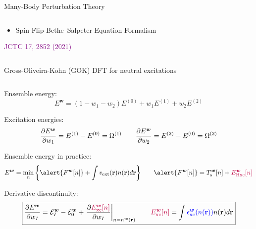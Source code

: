 \documentclass[aspectratio=169,9pt]{beamer}
\newcommand{\br}{\mathbf{r}}
\newcommand{\purple}[1]{\textcolor{purple}{#1}}
\newcommand{\blue}[1]{\textcolor{blue}{#1}}
\newcommand{\pub}[1]{{\small \textcolor{purple}{#1}}}
\begin{document}
\begin{frame}{Many-Body Perturbation Theory}
\begin{columns}
        \begin{column}{0.50\textwidth}
	\begin{itemize}
	\item Spin-Flip Bethe–Salpeter Equation Formalism
	\end{itemize}
	\pub{JCTC 17, 2852 (2021)}
        \end{column}
        \end{columns}
\end{frame}


\begin{frame}{Gross-Oliveira-Kohn (GOK) DFT for neutral excitations}
        \begin{columns}
        \begin{column}{0.80\textwidth}

        Ensemble energy:
        \begin{equation*}
                \boxed{E^{\bm{w}}= (1 - w_1 - w_2) E^{(0)} + w_1 E^{(1)} + w_2 E^{(2)}}
        \end{equation*}

        Excitation energies:
        \begin{equation*}
                \pdv{E^{\bm{w}}}{w_{1}}= E^{(1)} - E^{(0)} = \Omega^{(1)}
                \qquad \pdv{E^{\bm{w}}}{w_{2}}= E^{(2)} - E^{(0)} = \Omega^{(2)}
        \end{equation*}

        Ensemble energy in practice:
        \begin{equation*}
                E^{\bm{w}} = \min_{n} \qty{ \alert{F^{\bm{w}}[n]} + \int v_\text{ext}(\br{}) n(\br{}) d\br{} }
                \qquad
                \alert{F^{\bm{w}}[n]} = T_\text{s}^{\bm{w}}[n] + \purple{E_\text{Hxc}^{\bm{w}}[n]}
        \end{equation*}

        Derivative discontinuity:
        \begin{equation*}
                \boxed{
                \pdv{E^{\bm{w}}}{w_I}
                = \mathcal{E}_{I}^{\bm{w}} - \mathcal{E}_{0}^{\bm{w}}
                + \left. \pdv{\purple{E_\text{xc}^{\bm{w}}[n]}}{w_{I}} \right|_{n = n^{\bm{w}}(\br{})}
                \qquad
                \purple{E_\text{xc}^{\bm{w}}[n]} = \int \blue{\epsilon_\text{xc}^{\bm{w}}(n(\br{}))} n(\br{}) d\br{}
                }
        \end{equation*}

        \end{column}


\end{columns}
\end{frame}
\end{document}
